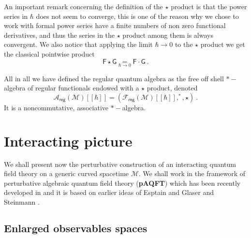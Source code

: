 \documentclass[11pt]{book}
\newcommand{\reg}{\mathsf{reg}}
\newcommand{\Acal}{\mathcal{A}}
\newcommand{\Fcal}{\mathcal{F}}
\newcommand{\Mcal}{\mathcal{M}}
\newcommand{\Fsf}{\mathsf{F}}
\newcommand{\Gsf}{\mathsf{G}}
\theoremstyle{break}
\begin{document}
An important remark concerning the definition of the $\star$ product is that the power series in $\hbar$ does not seem to converge, this is one of the reason why we chose to work with formal power series have a finite numbers of non zero functional derivatives, and thus the series in the $\star$ product among them is always convergent. We also notice that applying the limit $\hbar \to 0$ to the $\star$ product we get the classical pointwise product
%
\begin{equation*}
\Fsf \star \Gsf \underset{\hbar \to 0}{=} \Fsf \cdot \Gsf \ . 
\end{equation*}


All in all we have defined the regular quantum algebra as the free off shell $\ast-$algebra of regular functionals endowed with a $\star$ product, denoted
%
\begin{equation}
\Acal_\reg(\Mcal)[[\hbar]] = \left(\Fcal_\reg(\Mcal)[[\hbar]] , ^\ast , \star \right) \ . 
\label{eq:alg_q_reg}
\end{equation}
%
It is a noncommutative, associative $\ast-$algebra.


\section{Interacting picture}


We shall present now the perturbative construction of an interacting quantum field theory on a generic curved spacetime $\Mcal$. We shall work in the framework of perturbative algebraic quantum field theory (\textbf{pAQFT}) which has been recently developed in \cite{brunetti_perturbative_2009,fredenhagen_perturbative_2015,fredenhagen_batalin-vilkovisky_2013} and it is based on earlier ideas of Esptain and Glaser and Steinmann \cite{epstein_glaser,steinmann_perturbation_1971}.


\subsection{Enlarged observables spaces}
\end{document}
